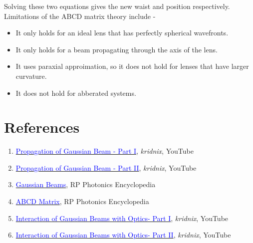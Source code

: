 \documentclass{article}[11pt]
\begin{document}
Solving these two equations gives the new waist and position respectively.
\medskip
\\
Limitations of the ABCD matrix theory include -
\begin{itemize}
    \item It only holds for an ideal lens that has perfectly spherical wavefronts. 
    
    \item It only holds for a beam propagating through the axis of the lens.
    
    \item It uses paraxial approimation, so it does not hold for lenses that have larger curvature.
    
    \item It does not hold for abberated systems.
\end{itemize}


\section{References}
\begin{enumerate}
    \item \href{https://www.youtube.com/watch?v=tmO3LK-YVzM&t=1s}{\textcolor{blue}{Propagation of Gaussian Beam - Part I}}, {\it kridnix}, YouTube
    
    \item \href{https://www.youtube.com/watch?v=tmO3LK-YVzM&t=1s}{\textcolor{blue}{Propagation of Gaussian Beam - Part II}}, {\it kridnix}, YouTube
    
    \item \href{https://www.rp-photonics.com/gaussian_beams.html}{\textcolor{blue}{Gaussian Beams}}, RP Photonics Encyclopedia
    
    \item \href{https://www.rp-photonics.com/abcd_matrix.html}{\textcolor{blue}{ABCD Matrix}}, RP Photonics Encyclopedia
    
    \item \href{https://www.youtube.com/watch?v=vreRlcbAAa0}{\textcolor{blue}{Interaction of Gaussian Beams with Optics- Part I}}, {\it kridnix}, YouTube
    
    \item \href{https://www.youtube.com/watch?v=Co_fLz4K3Ko}{\textcolor{blue}{Interaction of Gaussian Beams with Optics- Part II}}, {\it kridnix}, YouTube
\end{enumerate}
\end{document}
